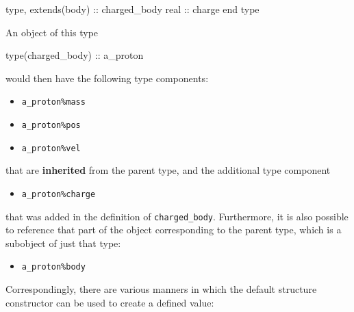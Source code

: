 \documentclass[
  paper=a4,
  ,captions=tableheading
]{scrartcl}
\newenvironment{Shaded}{\begin{snugshade}}{\end{snugshade}}
\newcommand{\DataTypeTok}[1]{\textcolor[rgb]{0.13,0.29,0.53}{#1}}
\newcommand{\NormalTok}[1]{#1}
\providecommand{\tightlist}{%
  \setlength{\itemsep}{0pt}\setlength{\parskip}{0pt}}
\begin{document}
\begin{Shaded}
\begin{Highlighting}[]
\DataTypeTok{type}\NormalTok{, }\DataTypeTok{extends(body)} \DataTypeTok{::}\NormalTok{ charged\_body}
  \DataTypeTok{real} \DataTypeTok{::}\NormalTok{ charge}
\DataTypeTok{end type}
\end{Highlighting}
\end{Shaded}

An object of this type

\begin{Shaded}
\begin{Highlighting}[]
\DataTypeTok{type(charged\_body)} \DataTypeTok{::}\NormalTok{ a\_proton}
\end{Highlighting}
\end{Shaded}

would then have the following type components:

\begin{itemize}
\tightlist
\item
  \texttt{a\_proton\%mass}
\item
  \texttt{a\_proton\%pos}
\item
  \texttt{a\_proton\%vel}
\end{itemize}

that are \textbf{inherited} from the parent type, and the additional
type component

\begin{itemize}
\tightlist
\item
  \texttt{a\_proton\%charge}
\end{itemize}

that was added in the definition of \texttt{charged\_body}. Furthermore,
it is also possible to reference that part of the object corresponding
to the parent type, which is a subobject of just that type:

\begin{itemize}
\tightlist
\item
  \texttt{a\_proton\%body}
\end{itemize}

Correspondingly, there are various manners in which the default
structure constructor can be used to create a defined value:
\end{document}
